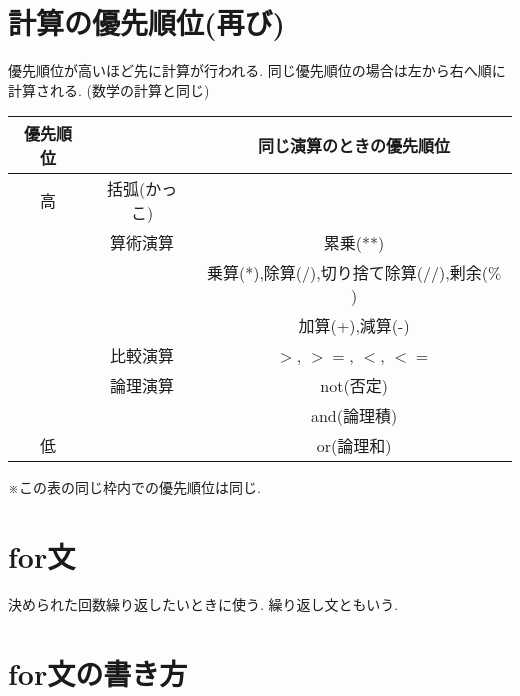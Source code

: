 \documentclass[dvipdfmx]{jsbook}
\newcommand{\countup}[1]{\setcounter{chapter}{#1} \setcounter{section}{0}}
\begin{document}
\section{計算の優先順位(再び)}
優先順位が高いほど先に計算が行われる. 同じ優先順位の場合は左から右へ順に計算される. (数学の計算と同じ) \par
\begin{tabular}[t]{|c|c|c|}
	\hline
	優先順位 &              & 同じ演算のときの優先順位                    \\
	\hline \hline
	高       & 括弧(かっこ) &                                             \\ \hline
	         & 算術演算     & 累乗(**)                                    \\ \hline
	         &              & 乗算(*),除算(/),切り捨て除算(//),剰余($\%$) \\ \hline
	         &              & 加算(+),減算(-)                             \\ \hline
	         & 比較演算     & $>$, $>=$,  $<$,  $<=$                      \\ \hline
	         & 論理演算     & not(否定)                                   \\ \hline
	         &              & and(論理積)                                 \\ \hline
	低       &              & or(論理和)                                  \\ \hline
\end{tabular} \par
※この表の同じ枠内での優先順位は同じ.

\newpage

\section*{for文}
決められた回数繰り返したいときに使う. 繰り返し文ともいう.
\countup{5}
\section{for文の書き方}
\end{document}
